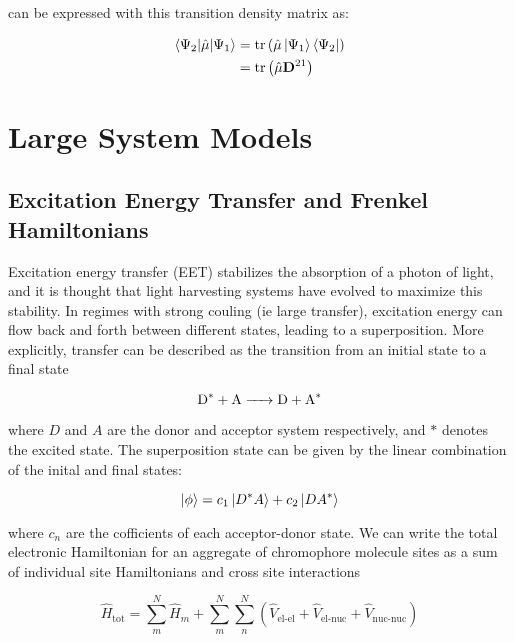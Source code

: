 can be expressed with this transition density matrix as:

\begin{equation}
\begin{split}    
\braket{\Psi_2|\hat{\mathbf{\mu}}|\Psi_1} &= \text{tr}\left(\hat{\mathbf{\mu}} \ket{\Psi_1} \bra{\Psi_2} \right) \\
&= \text{tr}\left( \hat{\mathbf{\mu}} \mathbf{D}^{21}\right)
\end{split}
\end{equation}

\section{Large System Models}
\label{sec:large_systems_theory}

\subsection{Excitation Energy Transfer and Frenkel Hamiltonians}

Excitation energy transfer (EET) stabilizes the absorption of a photon of light,
and it is thought that light harvesting systems have evolved to maximize this stability\cite{Cleary2013}.
In regimes with strong couling (ie large transfer), excitation energy can flow back
and forth between different states, leading to a superposition. More explicitly,
transfer can be described as the transition from an initial state to a final state

\begin{equation}
\ce{D^* + A -> D + A^*}
\end{equation}

where $D$ and $A$ are the donor and acceptor system respectively, and $*$ denotes
the excited state. The superposition state can be given by the linear combination 
of the inital and final states:

\begin{equation}
\ket{\phi} = c_1 \ket{D^*A} + c_2 \ket{DA^*}
\end{equation}

where $c_n$ are the cofficients of each acceptor-donor state. We can write the total
electronic Hamiltonian for an aggregate of chromophore molecule sites as a sum of
individual site Hamiltonians and cross site interactions

\begin{equation}
\hat{H}_{\text{tot}} = \sum^N_m \hat{H}_m + \sum^N_m \sum^N_n \left(\hat{V}_{\text{el-el}} + \hat{V}_{\text{el-nuc}} + \hat{V}_{\text{nuc-nuc}}\right)
\end{equation}

